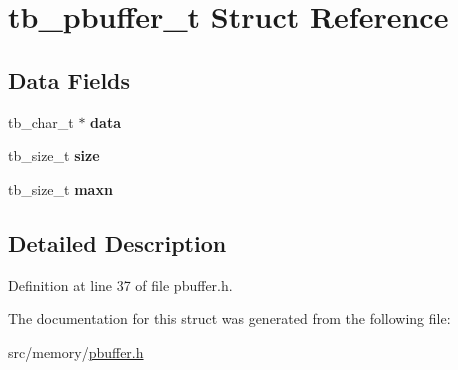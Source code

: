 \hypertarget{structtb__pbuffer__t}{\section{tb\-\_\-pbuffer\-\_\-t Struct Reference}
\label{structtb__pbuffer__t}
}
\subsection*{Data Fields}
\begin{DoxyCompactItemize}
\item 
\hypertarget{structtb__pbuffer__t_a7d94ef060727691bc7fc7717b426ca42}{tb\-\_\-char\-\_\-t $\ast$ {\bfseries data}}\label{structtb__pbuffer__t_a7d94ef060727691bc7fc7717b426ca42}

\item 
\hypertarget{structtb__pbuffer__t_a7428612da7a89a7a79d42e113ffbe072}{tb\-\_\-size\-\_\-t {\bfseries size}}\label{structtb__pbuffer__t_a7428612da7a89a7a79d42e113ffbe072}

\item 
\hypertarget{structtb__pbuffer__t_a7ff5c50cc5831edd2b65a159e83da573}{tb\-\_\-size\-\_\-t {\bfseries maxn}}\label{structtb__pbuffer__t_a7ff5c50cc5831edd2b65a159e83da573}

\end{DoxyCompactItemize}


\subsection{Detailed Description}


Definition at line 37 of file pbuffer.\-h.



The documentation for this struct was generated from the following file\-:\begin{DoxyCompactItemize}
\item 
src/memory/\hyperlink{pbuffer_8h}{pbuffer.\-h}\end{DoxyCompactItemize}
